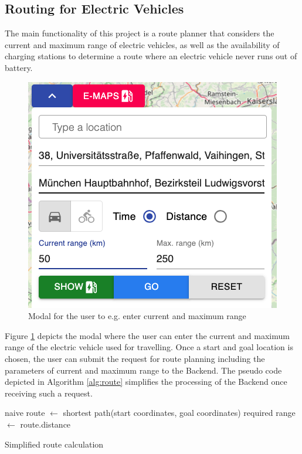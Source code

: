 \documentclass[a4paper]{article}
\begin{document}
\subsection{Routing for Electric Vehicles}
The main functionality of this project is a route planner that considers the current and maximum range of electric vehicles, as well as the availability of charging stations to determine a route where an electric vehicle never runs out of battery.
\begin{figure}[h]
    \centering
    \includegraphics[scale=0.45]{figures/input}
    \caption{Modal for the user to e.g. enter current and maximum range}
    \label{fig:input}
\end{figure}
Figure \ref{fig:input} depicts the modal where the user can enter the current and maximum range of the electric vehicle used for travelling.
Once a start and goal location is chosen, the user can submit the request for route planning including the parameters of current and maximum range to the Backend.
The pseudo code depicted in Algorithm \ref{alg:route} simplifies the processing of the Backend once receiving such a request.\par\bigskip
\begin{algorithm}[H]
naive route $\leftarrow$  shortest path(start coordinates, goal coordinates)\;
required range $\leftarrow$ route.distance\;
 \caption{Simplified route calculation}
 \label{alg:route}
\end{algorithm}\par\bigskip
\end{document}
